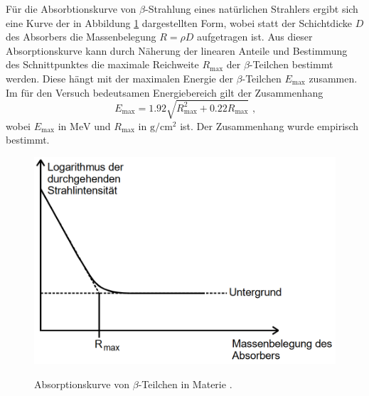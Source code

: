 Für die Absorbtionskurve von $\beta$-Strahlung eines natürlichen Strahlers ergibt sich eine Kurve der in Abbildung \ref{fig:kurvenverlauf2} dargestellten Form, wobei statt der Schichtdicke $D$ des Absorbers die Massenbelegung $R = \rho D$ aufgetragen ist. Aus dieser Absorptionskurve kann durch Näherung der linearen Anteile und Bestimmung des Schnittpunktes die maximale Reichweite $R_\text{max}$ der $\beta$-Teilchen bestimmt werden. Diese hängt mit der maximalen Energie der $\beta$-Teilchen $E_\text{max}$ zusammen. Im für den Versuch bedeutsamen Energiebereich gilt der Zusammenhang
\begin{equation}
	E_\text{max}=1.92 \sqrt{R_\text{max}^2 + 0.22 R_\text{max}}\text{ ,}\label{eq:HJKH}
\end{equation}
wobei $E_\text{max}$ in $\si{\mega\electronvolt}$ und $R_\text{max}$ in $\si{\gram\per\centi\meter\squared}$ ist.
Der Zusammenhang wurde empirisch bestimmt.









\begin{figure}
	\centering
	\caption{Absorptionskurve von $\beta$-Teilchen in Materie \cite{V704}.}
	\includegraphics[width=\linewidth-170pt,height=\textheight-170pt,keepaspectratio]{content/images/kurvenverlauf2.png}
	\label{fig:kurvenverlauf2}
\end{figure}





